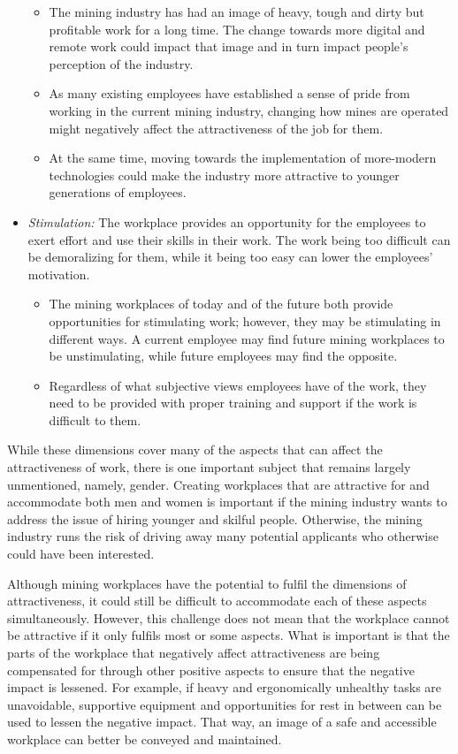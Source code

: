 \documentclass[
  12pt,
]{scrbook}
\begin{document}
\begin{itemize}
  \begin{itemize}
  \item
    The mining industry has had an image of heavy, tough and dirty but profitable work for a long time. The change towards more digital and remote work could impact that image and in turn impact people's perception of the industry.
  \item
    As many existing employees have established a sense of pride from working in the current mining industry, changing how mines are operated might negatively affect the attractiveness of the job for them.
  \item
    At the same time, moving towards the implementation of more-modern technologies could make the industry more attractive to younger generations of employees.
  \end{itemize}
\item
  \emph{Stimulation:} The workplace provides an opportunity for the employees to exert effort and use their skills in their work. The work being too difficult can be demoralizing for them, while it being too easy can lower the employees' motivation.

  \begin{itemize}
  \item
    The mining workplaces of today and of the future both provide opportunities for stimulating work; however, they may be stimulating in different ways. A current employee may find future mining workplaces to be unstimulating, while future employees may find the opposite.
  \item
    Regardless of what subjective views employees have of the work, they need to be provided with proper training and support if the work is difficult to them.
  \end{itemize}
\end{itemize}

While these dimensions cover many of the aspects that can affect the attractiveness of work, there is one important subject that remains largely unmentioned, namely, gender. Creating workplaces that are attractive for and accommodate both men and women is important if the mining industry wants to address the issue of hiring younger and skilful people. Otherwise, the mining industry runs the risk of driving away many potential applicants who otherwise could have been interested.

Although mining workplaces have the potential to fulfil the dimensions of attractiveness, it could still be difficult to accommodate each of these aspects simultaneously. However, this challenge does not mean that the workplace cannot be attractive if it only fulfils most or some aspects. What is important is that the parts of the workplace that negatively affect attractiveness are being compensated for through other positive aspects to ensure that the negative impact is lessened. For example, if heavy and ergonomically unhealthy tasks are unavoidable, supportive equipment and opportunities for rest in between can be used to lessen the negative impact. That way, an image of a safe and accessible workplace can better be conveyed and maintained.
\end{document}
